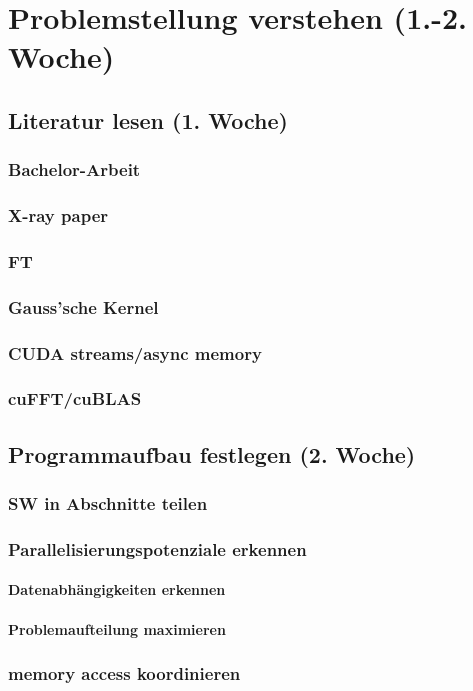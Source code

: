 \documentclass[a4paper]{article}
\title{}
\author{Philipp Trommler}
\date{\today}
\begin{document}
\section{Problemstellung verstehen (1.-2. Woche)}
\subsection{Literatur lesen (1. Woche)}
\subsubsection{Bachelor-Arbeit}
\subsubsection{X-ray paper}
\subsubsection{FT}
\subsubsection{Gauss'sche Kernel}
\subsubsection{CUDA streams/async memory}
\subsubsection{cuFFT/cuBLAS}
\subsection{Programmaufbau festlegen (2. Woche)}
\subsubsection{SW in Abschnitte teilen}
\subsubsection{Parallelisierungspotenziale erkennen}
\paragraph{Datenabhängigkeiten erkennen}
\paragraph{Problemaufteilung maximieren}
\subsubsection{memory access koordinieren}
\end{document}
